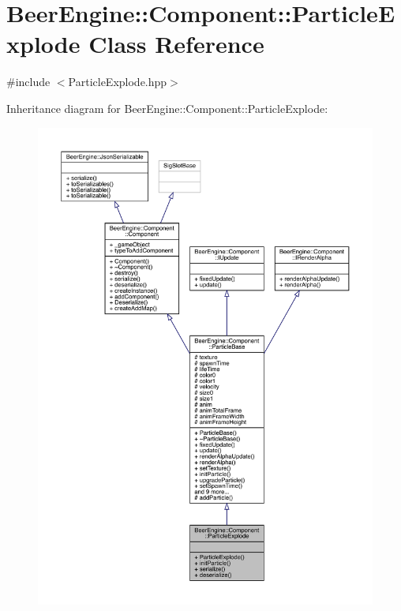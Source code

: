 \hypertarget{class_beer_engine_1_1_component_1_1_particle_explode}{}\section{Beer\+Engine\+:\+:Component\+:\+:Particle\+Explode Class Reference}
\label{class_beer_engine_1_1_component_1_1_particle_explode}


{\ttfamily \#include $<$Particle\+Explode.\+hpp$>$}



Inheritance diagram for Beer\+Engine\+:\+:Component\+:\+:Particle\+Explode\+:\nopagebreak
\begin{figure}[H]
\begin{center}
\leavevmode
\includegraphics[width=350pt]{class_beer_engine_1_1_component_1_1_particle_explode__inherit__graph}
\end{center}
\end{figure}


